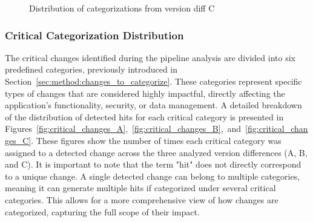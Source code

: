 \begin{figure}[H]
    \centering
    \resizebox{0.92\textwidth}{!}{%
        \begin{tikzpicture}
        \path[%
            dc sector/.append style={shift={(\MedA:5pt)}}, %
            dc dtag/.append style={},
            dc legend/.append style={text width=3cm, align=right},
            every pin/.style={fill=\Cj,draw=\Cj!50!black,thick},
            /DiagCirc/.cd,
            value list={152/Critical,197/Non-critical,28/Uncategorized},
            color list={"color10","color11","color12"},
            angle max=180,             %
            angle corr={0,0,0,0,0},    %
            legend=\N\ :\hfill \V,     %
            factor=.9,
            percent corr={0,0,0,0,0}, %
            shift sector={0,0,0,0,0}, %
            tags={%
                \P                   %
            },
            sup loop={%
                \def\Pin{{330,  100,           150}}
                \pgfmathparse{array(\Pin,\j)}
                \edef\Pinj{\pgfmathresult}
                \node[pin=\Pinj:\N] at (DC\j) {};
            },
            diagram] ;
        
        \end{tikzpicture}
    }
    \caption{Distribution of categorizations from version diff C}
    \label{fig:categorization_C}
\end{figure}



\subsubsection{Critical Categorization Distribution}
The critical changes identified during the pipeline analysis are divided into six predefined categories, previously introduced in Section~\ref{sec:method:changes_to_categorize}. These categories represent specific types of changes that are considered highly impactful, directly affecting the application's functionality, security, or data management. 
A detailed breakdown of the distribution of detected hits for each critical category is presented in Figures~\ref{fig:critical_changes_A},~\ref{fig:critical_changes_B},~and~\ref{fig:critical_changes_C}. These figures show the number of times each critical category was assigned to a detected change across the three analyzed version differences (A, B, and C).
It is important to note that the term "hit" does not directly correspond to a unique change. A single detected change can belong to multiple categories, meaning it can generate multiple hits if categorized under several critical categories. This allows for a more comprehensive view of how changes are categorized, capturing the full scope of their impact.


